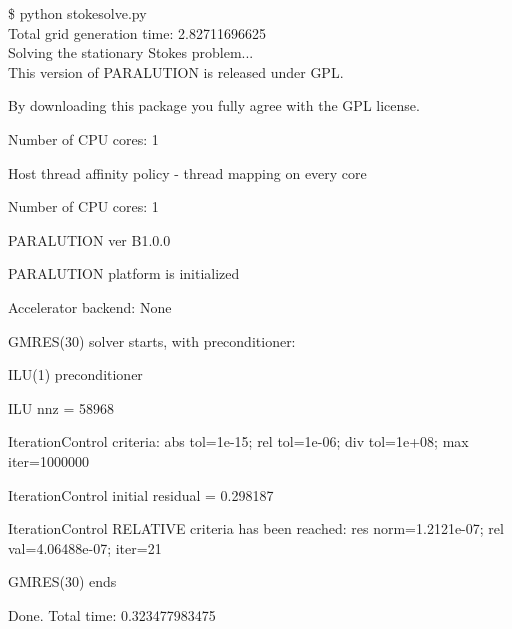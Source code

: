 \documentclass{report}
\begin{document}
\begin{mdframed}[style=MyFrame]
\footnotesize
\$ python stokesolve.py
\\

\noindent \hspace{.1cm} Total grid generation time: 2.82711696625
\\

\noindent \hspace{.1cm} Solving the stationary Stokes problem...
\\

\noindent \hspace{.1cm} This version of PARALUTION is released under GPL.

\noindent \hspace{.1cm} By downloading this package you fully agree with the GPL license.

\noindent \hspace{.1cm} Number of CPU cores: 1

\noindent \hspace{.1cm} Host thread affinity policy - thread mapping on every core

\noindent \hspace{.1cm} Number of CPU cores: 1

\noindent \hspace{.1cm} PARALUTION ver B1.0.0

\noindent \hspace{.1cm} PARALUTION platform is initialized

\noindent \hspace{.1cm} Accelerator backend: None

\noindent \hspace{.1cm} GMRES(30) solver starts, with preconditioner:

\noindent \hspace{.1cm} ILU(1) preconditioner

\noindent \hspace{.1cm} ILU nnz = 58968

\noindent \hspace{.1cm} IterationControl criteria: abs tol=1e-15; rel tol=1e-06; div tol=1e+08; max iter=1000000

\noindent \hspace{.1cm} IterationControl initial residual = 0.298187

\noindent \hspace{.1cm} IterationControl RELATIVE criteria has been reached: res norm=1.2121e-07; rel val=4.06488e-07; iter=21

\noindent \hspace{.1cm} GMRES(30) ends

\noindent \hspace{.1cm} Done. Total time: 0.323477983475

\end{mdframed}
\end{document}

